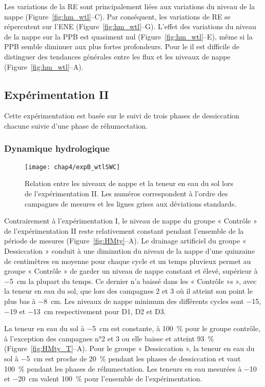 Les variations de la RE sont principalement liées aux variations du niveau de la nappe (Figure~\ref{fig:hm_wtl}--C).
Par conséquent, les variations de RE se répercutent sur l'ENE (Figure~\ref{fig:hm_wtl}--G).
L'effet des variations du niveau de la nappe sur la PPB est quasiment nul (Figure~\ref{fig:hm_wtl}--E), même si la PPB semble diminuer aux plus fortes profondeurs.
Pour le \chh il est difficile de distinguer des tendances générales entre les flux et les niveaux de nappe (Figure~\ref{fig:hm_wtl}--A).

\subsection{Expérimentation II}

Cette expérimentation est basée sur le suivi de trois phases de dessiccation chacune suivie d'une phase de réhumectation.

\subsubsection{Dynamique hydrologique}

\begin{figure}
\centering
\texttt{[image: chap4/expB\_wtlSWC]}
\caption{Relation entre les niveaux de nappe et la teneur en eau du sol lors de l'expérimentation II. Les numéros correspondent à l'ordre des campagnes de mesures et les lignes grises aux déviations standards.}
\label{fig:wtlSWC_B}
\end{figure}

Contrairement à l'expérimentation I, le niveau de nappe du groupe « Contrôle » de l'expérimentation II reste relativement constant pendant l'ensemble de la période de mesures (Figure~\ref{fig:HMty}--A).
Le drainage artificiel du groupe « Dessiccation » conduit à une diminution du niveau de la nappe d'une quinzaine de centimètres en moyenne pour chaque cycle et un temps pluvieux permet au groupe « Contrôle » de garder un niveau de nappe constant et élevé, supérieur à \SI{-5}{\centi\metre} la plupart du temps.
Ce dernier n'a baissé dans les « Contrôle »s », avec la teneur en eau du sol, que lors des campagnes 2 et 3 où il atteint son point le plus bas à \SI{-8}{\centi\metre}.
Les niveaux de nappe minimum des différents cycles sont \num{-15}, \num{-19} et \SI{-13}{\centi\metre} respectivement pour D1, D2 et D3.

La teneur en eau du sol à \SI{-5}{\centi\metre} est constante, à \SI{100}{\percent} pour le groupe contrôle, à l'exception des campagnes n°2 et 3 ou elle baisse et atteint \SI{93}{\percent} (Figure~\ref{fig:HMty_T}--A).
Pour le groupe « Dessiccation », la teneur en eau du sol à \SI{-5}{\centi\metre} est proche de \SI{20}{\percent} pendant les phases de dessiccation et vaut \SI{100}{\percent} pendant les phases de réhumectation.
Les teneurs en eau mesurées à \num{-10} et \SI{-20}{\centi\metre} valent \SI{100}{\percent} pour l'ensemble de l'expérimentation.

